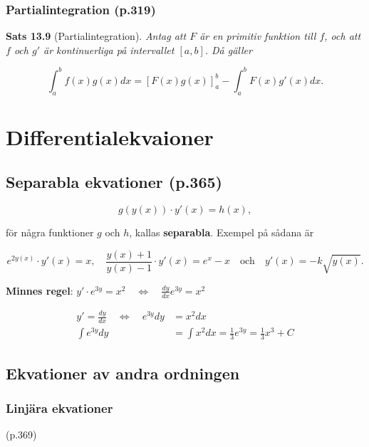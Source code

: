 \documentclass[11pt]{article}
\begin{document}
\subsubsection{Partialintegration (p.319)}

\textbf{Sats 13.9} (Partialintegration). \textit{Antag att $F$ är en primitiv funktion till $f$, och att $f$ och $g'$ är kontinuerliga på intervallet $[a, b]$. Då gäller}

\begin{equation}
    \int_a^b{f(x)g(x)}dx = \left [F(x)g(x)\right ]_a^b - \int_a^b{F(x)g'(x)}dx.
\end{equation}

\newpage
\section{Differentialekvaioner}

\subsection{Separabla ekvationer (p.365)}

\begin{equation}
    g(y(x)) \cdot y'(x) = h(x),
\end{equation}

för några funktioner $g$ och $h$, kallas \textbf{separabla}. Exempel på sådana är

\begin{equation}
    e^{2y(x)} \cdot y'(x) = x, \quad \frac{y(x) + 1}{y(x) - 1} \cdot y'(x) = e^x - x \quad \text{och} \quad y'(x) = -k\sqrt{y(x)}.
\end{equation}

\textbf{Minnes regel}: $y' \cdot e^{3y} = x^2 \quad \Leftrightarrow \quad \frac{dy}{dx}e^{3y} = x^2$

\begin{align}
    y' = \frac{dy}{dx} \quad \Leftrightarrow \quad e^{3y}dy &= x^2 dx\\
    \int e^{3y}dy &= \int x^2 dx = \frac{1}{3} e^{3y} = \frac{1}{3} x^3 + C
\end{align}

\subsection{Ekvationer av andra ordningen}

\subsubsection{Linjära ekvationer} (p.369)
\end{document}
